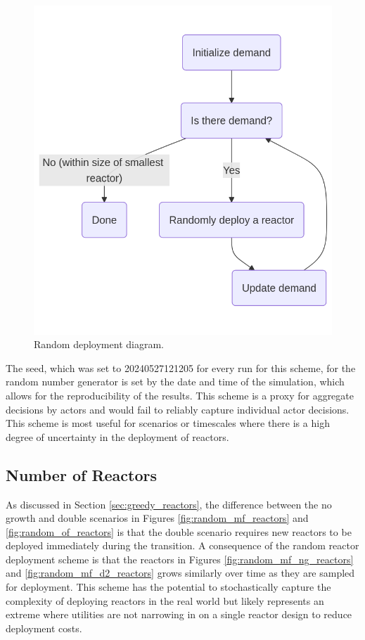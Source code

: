 \begin{figure}[H]
    \centering
    \includegraphics[scale=0.3]{images/schemes/random_diagram.png}
    \caption{Random deployment diagram.}
    \label{fig:random_diagram}
\end{figure}

The seed, which was set to 20240527121205 for every run for this scheme, for
the random number generator is set by the date and time of the simulation,
which allows for the reproducibility of the results. This scheme is a proxy for
aggregate decisions by actors and would fail to reliably capture individual
actor decisions. This scheme is most useful for scenarios or timescales where
there is a high degree of uncertainty in the deployment of reactors.


\subsection{Number of Reactors}
\label{sec:random_reactors}

As discussed in Section \ref{sec:greedy_reactors}, the difference between the no growth and double scenarios in Figures \ref{fig:random_mf_reactors} and \ref{fig:random_of_reactors} is that the double scenario requires new reactors to be deployed immediately during the transition. A consequence of the random reactor deployment scheme is that the reactors in Figures \ref{fig:random_mf_ng_reactors} and \ref{fig:random_mf_d2_reactors} grows similarly over time as they are sampled for deployment. This scheme has the potential to stochastically capture the complexity of deploying reactors in the real world but likely represents an extreme where utilities are not narrowing in on a single reactor design to reduce deployment costs.

